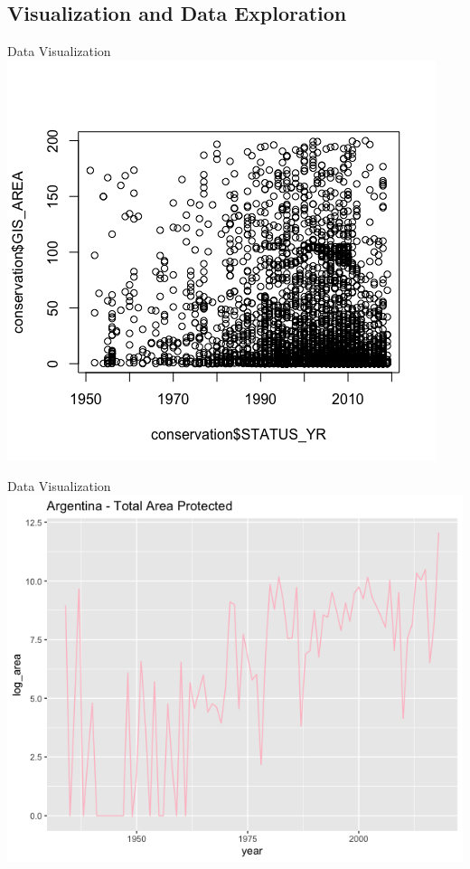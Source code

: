 \documentclass{beamer}
\begin{document}
\subsection{Visualization and Data Exploration} 
\begin{frame}{Data Visualization}
\includegraphics[width = .8\textwidth]{scatter_plot.png}
\end{frame} 
\begin{frame}{Data Visualization}
\includegraphics[width = .8\textwidth]{arg_tot.png}
\end{frame} 
\end{document}
